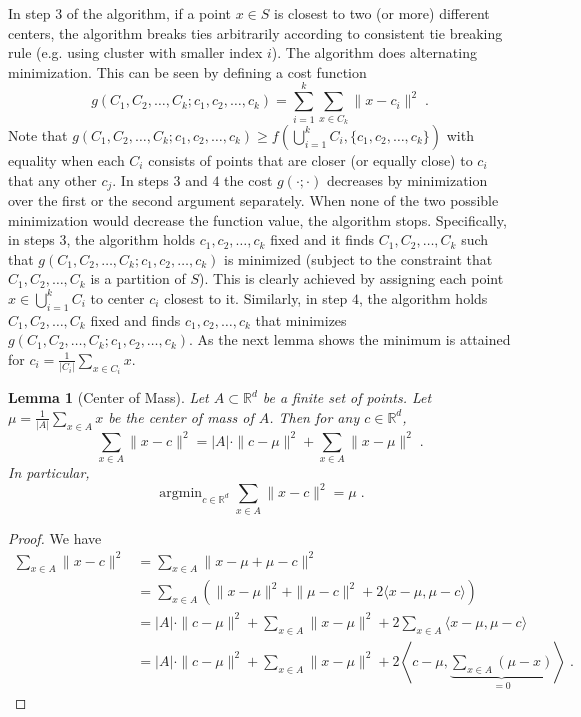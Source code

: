 \documentclass{article}
\newtheorem{lemma}{Lemma}
\newcommand{\R}{\mathbb{R}}
\newcommand{\norm}[1]{\|{#1}\|}
\DeclareMathOperator*{\argmin}{argmin}
\begin{document}
In step $3$ of the algorithm, if a point $x \in S$ is closest to two (or more)
different centers, the algorithm breaks ties arbitrarily according to
consistent tie breaking rule (e.g. using cluster with smaller index $i$). The
algorithm does alternating minimization.  This can be seen by defining a cost
function
$$
g(C_1, C_2, \dots, C_k; c_1, c_2, \dots, c_k) = \sum_{i=1}^k \sum_{x \in C_k} \norm{x - c_i}^2 \; .
$$
Note that $g(C_1, C_2, \dots, C_k; c_1, c_2, \dots, c_k) \ge f(\bigcup_{i=1}^k
C_i, \{c_1, c_2, \dots, c_k\})$ with equality when each $C_i$ consists of
points that are closer (or equally close) to $c_i$ that any other $c_j$. In
steps $3$ and $4$ the cost $g(\cdot;\cdot)$ decreases by minimization over the
first or the second argument separately.  When none of the two possible
minimization would decrease the function value, the algorithm stops.
Specifically, in steps $3$, the algorithm holds $c_1, c_2, \dots, c_k$ fixed
and it finds $C_1, C_2, \dots, C_k$ such that $g(C_1, C_2, \dots, C_k; c_1,
c_2, \dots, c_k)$ is minimized (subject to the constraint that $C_1, C_2,
\dots, C_k$ is a partition of $S$). This is clearly achieved by assigning each
point $x \in \bigcup_{i=1}^k C_i$ to center $c_i$ closest to it. Similarly, in
step $4$, the algorithm holds $C_1, C_2, \dots, C_k$ fixed and finds $c_1, c_2,
\dots, c_k$ that minimizes $g(C_1, C_2, \dots, C_k; c_1, c_2, \dots, c_k)$.  As
the next lemma shows the minimum is attained for $c_i = \frac{1}{|C_i|} \sum_{x
\in C_i} x$.

\begin{lemma}[Center of Mass]
Let $A \subset \R^d$ be a finite set of points. Let $\mu = \frac{1}{|A|}
\sum_{x \in A} x$ be the center of mass of $A$. Then for any $c \in \R^d$,
$$
\sum_{x \in A} \norm{x - c}^2 = |A| \cdot \norm{c - \mu}^2 + \sum_{x \in A} \norm{x - \mu}^2 \; .
$$
In particular,
$$
\argmin_{c \in \R^d} \sum_{x \in A} \norm{x - c}^2 = \mu \; .
$$
\end{lemma}

\begin{proof}
We have
\begin{align*}
\sum_{x \in A} \norm{x - c}^2
& = \sum_{x \in A} \norm{x - \mu + \mu - c}^2 \\
& = \sum_{x \in A} \left( \norm{x - \mu}^2  + \norm{\mu - c}^2 + 2 \langle x - \mu, \mu - c \rangle \right) \\
& = |A| \cdot \norm{c - \mu}^2 +  \sum_{x \in A} \norm{x - \mu}^2  + 2 \sum_{x \in A} \langle x - \mu, \mu - c \rangle \\
& = |A| \cdot \norm{c - \mu}^2 +  \sum_{x \in A} \norm{x - \mu}^2  + 2 \left\langle c - \mu,  \underbrace{\sum_{x \in A} (\mu - x)}_{=0} \right\rangle \; .
\end{align*}
\end{proof}
\end{document}
